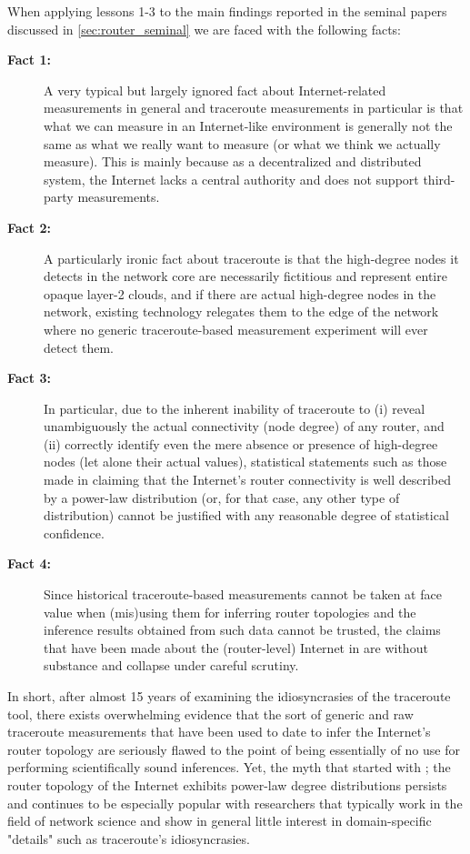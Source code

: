 When applying lessons 1-3 to the main findings reported in the seminal
papers discussed in \autoref{sec:router_seminal} we are faced with the
following facts:
\begin{description}
\item[{\bf Fact 1:}] A very typical but largely ignored fact about Internet-related 
measurements in general and traceroute measurements in particular is that what we can 
measure in an Internet-like environment is generally not the same as what we really 
want to measure (or what we think we actually measure). This is mainly because as a 
decentralized and distributed system, the Internet lacks a central authority and does 
not support third-party measurements.

\item[{\bf Fact 2:}] A particularly ironic fact about traceroute is that the high-degree nodes 
it detects in the network core are necessarily fictitious and represent entire opaque 
layer-2 clouds, and if there are actual high-degree nodes in the network, existing technology
relegates them to the edge of the network where no generic traceroute-based measurement
experiment will ever detect them.

\item[{\bf Fact 3:}] In particular, due to the inherent inability of traceroute to (i) reveal 
unambiguously the actual connectivity (\ie node degree) of any router, and (ii) correctly 
identify even the mere absence or presence of high-degree nodes (let alone their actual values),
statistical statements such as those made in \cite{faloutsos99:_power_law_relat_of_inter_topol} claiming that the Internet's router 
connectivity is well described by  a power-law distribution (or, for that case, any other type of distribution) cannot be justified with any reasonable degree of statistical confidence.

\item[{\bf Fact 4:}] Since historical traceroute-based measurements cannot be taken at 
face value when (mis)using them for inferring router topologies and the inference results 
obtained from such data cannot be trusted, the claims that have been made about the 
(router-level) Internet in \cite{barabasi00} are without substance and collapse under careful scrutiny.
\end{description}
 
In short, after almost 15 years of examining the idiosyncrasies of the traceroute tool,
there exists overwhelming evidence that the sort of generic and raw traceroute measurements
that have been used to date to infer the Internet's router topology are seriously flawed to 
the point of being essentially of no use for performing scientifically sound inferences. 
Yet, the myth that started with 
\cite{faloutsos99:_power_law_relat_of_inter_topol}; \ie the router topology of the Internet exhibits 
power-law degree distributions persists and continues to be especially popular with researchers 
that typically work in the field of network science and show in general little interest in 
domain-specific "details" such as traceroute's idiosyncrasies.


